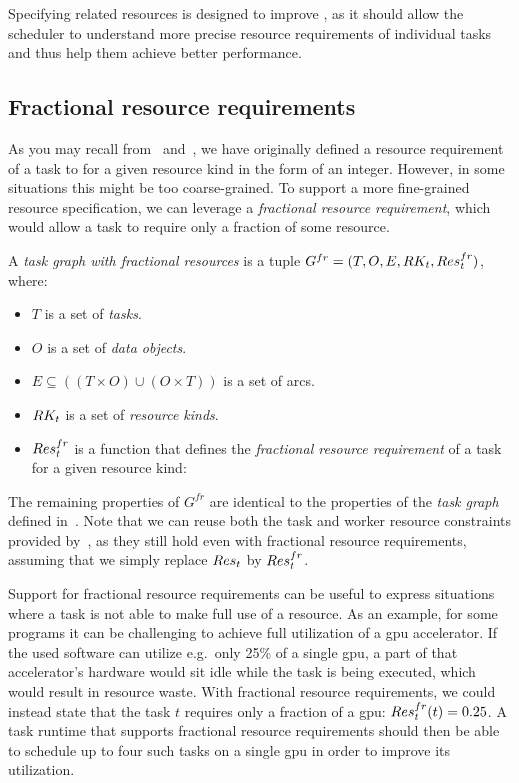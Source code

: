 Specifying related resources is designed to improve \efficiency{}, as it should allow the
scheduler to understand more precise resource requirements of individual tasks and thus help
them achieve better performance.

\subsection{Fractional resource requirements}
As you may recall from~ and~, we have originally
defined a resource requirement of a task to for a given resource kind in the form of an integer.
However, in some situations this might be too coarse-grained. To support a more fine-grained
resource specification, we can leverage a \emph{fractional resource requirement}, which would allow a task to
require only a fraction of some resource.

\vspace{2mm} A
\emph{task graph with fractional resources} is a tuple
$G^{fr} = (T, O, E, RK_t, Res_t^{fr})$, where:
\begin{itemize}[itemsep=0pt]
	\item $T$ is a set of \emph{tasks}.
	\item $O$ is a set of \emph{data objects}.
	\item $E \subseteq ((T\times{}O) \cup (O\times{}T))$ is a set of arcs.
	\item $RK_t$ is a set of \emph{resource kinds}.
	\item $Res_t^{fr}$ is a function that defines the
	      \emph{fractional resource requirement} of a task for a given resource kind: \\
\end{itemize}

The remaining properties of $G^{fr}$ are identical to the properties of the
\emph{task graph} defined in~. Note that we can reuse both the task
and worker resource constraints provided by~, as they still
hold even with fractional resource requirements, assuming that we simply replace $Res_t$ by
$Res_t^{fr}$.

Support for fractional resource requirements can be useful to express situations where a task is
not able to make full use of a resource. As an example, for some programs it can be challenging to
achieve full utilization of a \gls{gpu} accelerator. If the used software can utilize
e.g.\ only 25\% of a single \gls{gpu}, a part of that accelerator's hardware would
sit idle while the task is being executed, which would result in resource waste. With fractional
resource requirements, we could instead state that the task $t$ requires only a
fraction of a \gls{gpu}: $Res_t^{fr}(t) = 0.25$. A task runtime that supports
fractional resource requirements should then be able to schedule up to four such tasks on a single
\gls{gpu} in order to improve its utilization.

